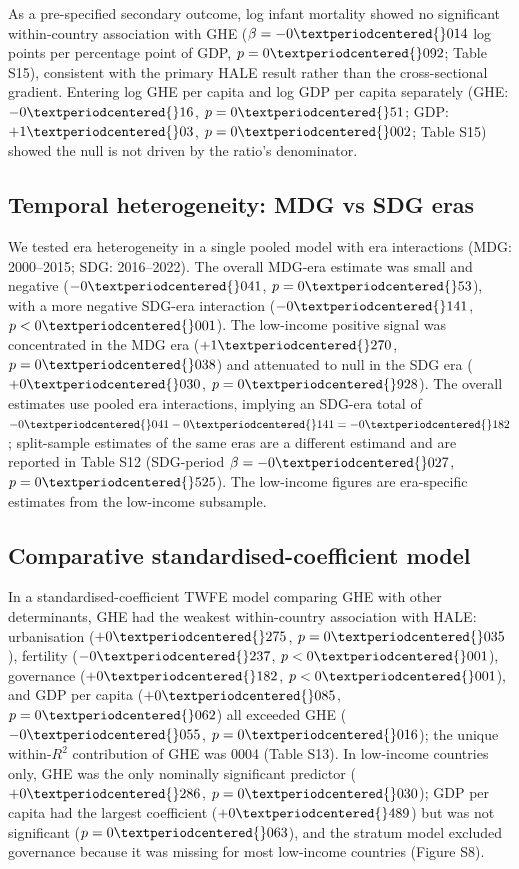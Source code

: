 \documentclass[12pt,a4paper]{article}
\begin{document}
As a pre-specified secondary outcome, log infant mortality showed no significant within-country association with GHE ($\beta = -0{\textperiodcentered{}}014$ log points per percentage point of GDP, $p = 0{\textperiodcentered{}}092$; Table S15), consistent with the primary HALE result rather than the cross-sectional gradient. Entering log GHE per capita and log GDP per capita separately (GHE: $-0{\textperiodcentered{}}16$, $p = 0{\textperiodcentered{}}51$; GDP: $+1{\textperiodcentered{}}03$, $p = 0{\textperiodcentered{}}002$; Table S15) showed the null is not driven by the ratio's denominator.

\subsection*{Temporal heterogeneity: MDG vs SDG eras}

We tested era heterogeneity in a single pooled model with era interactions (MDG: 2000--2015; SDG: 2016--2022). The overall MDG-era estimate was small and negative ($-0{\textperiodcentered{}}041$, $p = 0{\textperiodcentered{}}53$), with a more negative SDG-era interaction ($-0{\textperiodcentered{}}141$, $p < 0{\textperiodcentered{}}001$). The low-income positive signal was concentrated in the MDG era ($+1{\textperiodcentered{}}270$, $p = 0{\textperiodcentered{}}038$) and attenuated to null in the SDG era ($+0{\textperiodcentered{}}030$, $p = 0{\textperiodcentered{}}928$). The overall estimates use pooled era interactions, implying an SDG-era total of $-0{\textperiodcentered{}}041 - 0{\textperiodcentered{}}141 = -0{\textperiodcentered{}}182$; split-sample estimates of the same eras are a different estimand and are reported in Table S12 (SDG-period $\beta = -0{\textperiodcentered{}}027$, $p = 0{\textperiodcentered{}}525$). The low-income figures are era-specific estimates from the low-income subsample.

\subsection*{Comparative standardised-coefficient model}

In a standardised-coefficient TWFE model comparing GHE with other determinants, GHE had the weakest within-country association with HALE: urbanisation ($+0{\textperiodcentered{}}275$, $p = 0{\textperiodcentered{}}035$), fertility ($-0{\textperiodcentered{}}237$, $p < 0{\textperiodcentered{}}001$), governance ($+0{\textperiodcentered{}}182$, $p < 0{\textperiodcentered{}}001$), and GDP per capita ($+0{\textperiodcentered{}}085$, $p = 0{\textperiodcentered{}}062$) all exceeded GHE ($-0{\textperiodcentered{}}055$, $p = 0{\textperiodcentered{}}016$); the unique within-$R^2$ contribution of GHE was 0{\textperiodcentered{}}004 (Table S13). In low-income countries only, GHE was the only nominally significant predictor ($+0{\textperiodcentered{}}286$, $p = 0{\textperiodcentered{}}030$); GDP per capita had the largest coefficient ($+0{\textperiodcentered{}}489$) but was not significant ($p = 0{\textperiodcentered{}}063$), and the stratum model excluded governance because it was missing for most low-income countries (Figure S8).
\end{document}
